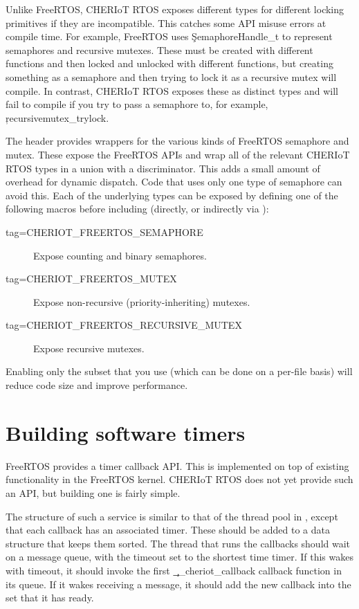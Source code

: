Unlike FreeRTOS, CHERIoT RTOS exposes different types for different locking primitives if they are incompatible.
This catches some API misuse errors at compile time.
For example, FreeRTOS uses \c{SemaphoreHandle_t} to represent semaphores and recursive mutexes.
These must be created with different functions and then locked and unlocked with different functions, but creating something as a semaphore and then trying to lock it as a recursive mutex will compile.
In contrast, CHERIoT RTOS exposes these as distinct types and will fail to compile if you try to pass a semaphore to, for example, \c{recursivemutex_trylock}.

The  header provides wrappers for the various kinds of FreeRTOS semaphore and mutex.
These expose the FreeRTOS APIs and wrap all of the relevant CHERIoT RTOS types in a union with a discriminator.
This adds a small amount of overhead for dynamic dispatch. 
Code that uses only one type of semaphore can avoid this.
Each of the underlying types can be exposed by defining one of the following macros before including  (directly, or indirectly via ):

\begin{description}
	\item[tag=CHERIOT_FREERTOS_SEMAPHORE]{ Expose counting and binary semaphores.}
	\item[tag=CHERIOT_FREERTOS_MUTEX]{ Expose non-recursive (priority-inheriting) mutexes.}
	\item[tag=CHERIOT_FREERTOS_RECURSIVE_MUTEX]{ Expose recursive mutexes.}
\end{description}

Enabling only the subset that you use (which can be done on a per-file basis) will reduce code size and improve performance.

\section{Building software timers}

FreeRTOS provides a timer callback API.
This is implemented on top of existing functionality in the FreeRTOS kernel.
CHERIoT RTOS does not yet provide such an API, but building one is fairly simple.

The structure of such a service is similar to that of the thread pool in , except that each callback has an associated timer.
These should be added to a data structure that keeps them sorted.
The thread that runs the callbacks should wait on a message queue, with the timeout set to the shortest time timer.
If this wakes with timeout, it should invoke the first \c{__cheriot_callback} callback function in its queue.
If it wakes receiving a message, it should add the new callback into the set that it has ready.

